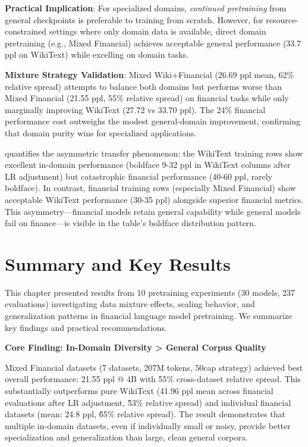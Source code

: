 \textbf{Practical Implication}: For specialized domains, \textit{continued pretraining} from general checkpoints is preferable to training from scratch. However, for resource-constrained settings where only domain data is available, direct domain pretraining (e.g., Mixed Financial) achieves acceptable general performance (33.7 ppl on WikiText) while excelling on domain tasks.

\textbf{Mixture Strategy Validation}: Mixed Wiki+Financial (26.69 ppl mean, 62\% relative spread) attempts to balance both domains but performs worse than Mixed Financial (21.55 ppl, 55\% relative spread) on financial tasks while only marginally improving WikiText (27.72 vs 33.70 ppl). The 24\% financial performance cost outweighs the modest general-domain improvement, confirming that domain purity wins for specialized applications.



 quantifies the asymmetric transfer phenomenon: the WikiText training rows show excellent in-domain performance (boldface 9-32 ppl in WikiText columns after LR adjustment) but catastrophic financial performance (40-60 ppl, rarely boldface). In contrast, financial training rows (especially Mixed Financial) show acceptable WikiText performance (30-35 ppl) alongside superior financial metrics. This asymmetry—financial models retain general capability while general models fail on finance—is visible in the table's boldface distribution pattern.

\section{Summary and Key Results}

This chapter presented results from 10 pretraining experiments (30 models, 237 evaluations) investigating data mixture effects, scaling behavior, and generalization patterns in financial language model pretraining. We summarize key findings and practical recommendations.

\textbf{Core Finding: In-Domain Diversity > General Corpus Quality}

Mixed Financial datasets (7 datasets, 207M tokens, 50cap strategy) achieved best overall performance: 21.55 ppl @ 4B with 55\% cross-dataset relative spread. This substantially outperforms pure WikiText (41.96 ppl mean across financial evaluations after LR adjustment, \~53\% relative spread) and individual financial datasets (mean: 24.8 ppl, \~65\% relative spread). The result demonstrates that multiple in-domain datasets, even if individually small or noisy, provide better specialization and generalization than large, clean general corpora.

